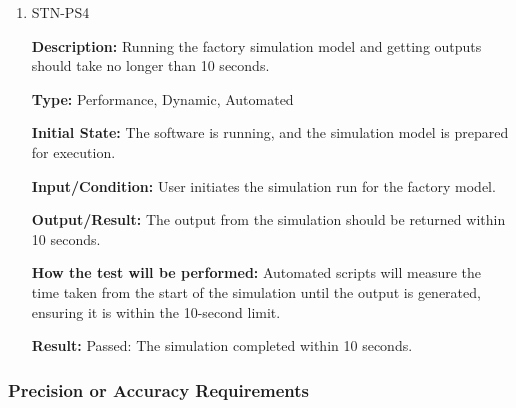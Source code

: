 \documentclass[12pt, titlepage]{article}
\begin{document}
\begin{enumerate}
\textbf{Description:} Restoring a schema from the filesystem should take less than 1 second.

\textbf{Type:} Performance, Dynamic, Automated

\textbf{Initial State:} The software is running and a previously saved schema is available.

\textbf{Input/Condition:} User initiates the restore operation for a schema.

\textbf{Output/Result:} The schema should be restored from the filesystem within 1 second.

\textbf{How the test will be performed:} Automated tests will measure the time taken to complete the restore operation, ensuring it is less than 1 second.

\textbf{Result:} Passed: The restore operation completed within 1 second.

\item{STN-PS4\\}

\textbf{Description:} Running the factory simulation model and getting outputs should take no longer than 10 seconds.

\textbf{Type:} Performance, Dynamic, Automated

\textbf{Initial State:} The software is running, and the simulation model is prepared for execution.

\textbf{Input/Condition:} User initiates the simulation run for the factory model.

\textbf{Output/Result:} The output from the simulation should be returned within 10 seconds.

\textbf{How the test will be performed:} Automated scripts will measure the time taken from the start of the simulation until the output is generated, ensuring it is within the 10-second limit.

\textbf{Result:} Passed: The simulation completed within 10 seconds.

\end{enumerate}

\subsubsection{Precision or Accuracy Requirements}
\end{document}
